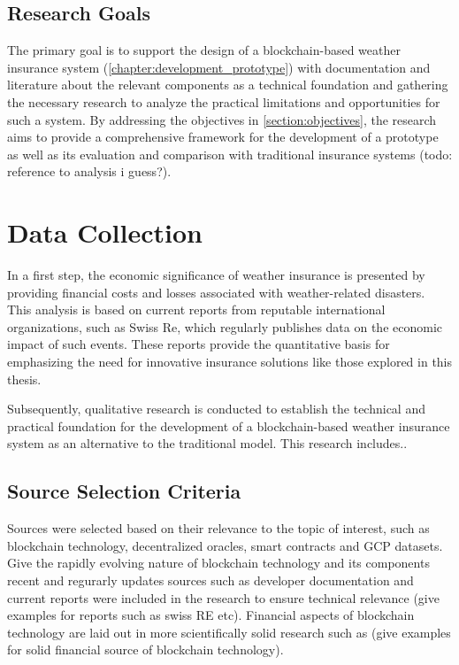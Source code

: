 \subsection{Research Goals}
The primary goal is to support the design of a blockchain-based weather insurance system (\cref{chapter:development_prototype}) with documentation and literature about the relevant components as a technical foundation and gathering the necessary research to analyze the practical limitations and opportunities for such a system. By addressing the objectives in \cref{section:objectives}, the research aims to provide a comprehensive framework for the development of a prototype as well as its evaluation and comparison with traditional insurance systems (todo: reference to analysis i guess?).

\section{Data Collection}\label{section:data_collection}

In a first step, the economic significance of weather insurance is presented by providing financial costs and losses associated with weather-related disasters. This analysis is based on current reports from reputable international organizations, such as Swiss Re, which regularly publishes data on the economic impact of such events. These reports provide the quantitative basis for emphasizing the need for innovative insurance solutions like those explored in this thesis.

Subsequently, qualitative research is conducted to establish the technical and practical foundation for the development of a blockchain-based weather insurance system as an alternative to the traditional model. This research includes..

\subsection{Source Selection Criteria}
Sources were selected based on their relevance to the topic of interest, such as blockchain technology, decentralized oracles, smart contracts and GCP datasets. Give the rapidly evolving nature of blockchain technology and its components  recent and regurarly updates sources such as developer documentation and current reports were included in the research to ensure technical relevance (give examples for reports such as swiss RE etc). Financial aspects of blockchain technology are laid out in more scientifically solid research such as (give examples for solid financial source of blockchain technology). 

